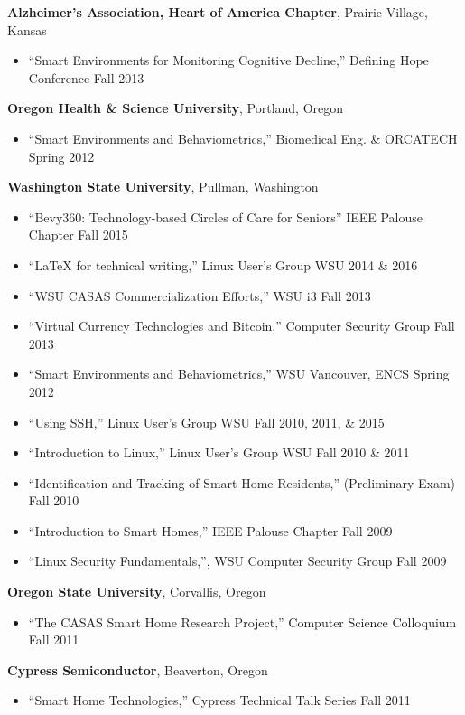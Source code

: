 {\bf Alzheimer's Association, Heart of America Chapter}, Prairie Village, Kansas
\begin{itemize}
  \item ``Smart Environments for Monitoring Cognitive Decline,'' Defining Hope Conference \hfill Fall 2013
\end{itemize}

{\bf Oregon Health \& Science University}, Portland, Oregon
\begin{itemize}
  \item ``Smart Environments and Behaviometrics,'' Biomedical Eng. \& ORCATECH \hfill Spring 2012
\end{itemize}

{\bf Washington State University}, Pullman, Washington
\begin{itemize}
  \item ``Bevy360: Technology-based Circles of Care for Seniors'' IEEE Palouse Chapter \hfill Fall 2015
  \item ``LaTeX for technical writing,'' Linux User's Group \@ WSU \hfill 2014 \& 2016
  \item ``WSU CASAS Commercialization Efforts,'' WSU i3 \hfill Fall 2013
  \item ``Virtual Currency Technologies and Bitcoin,'' Computer Security Group \hfill Fall 2013
  \item ``Smart Environments and Behaviometrics,'' WSU Vancouver, ENCS \hfill Spring 2012
	\item ``Using SSH,'' Linux User's Group \@ WSU \hfill Fall 2010, 2011, \& 2015
	\item ``Introduction to Linux,'' Linux User's Group \@ WSU \hfill Fall 2010 \& 2011
	\item ``Identification and Tracking of Smart Home Residents,'' (Preliminary Exam) \hfill Fall 2010
	\item ``Introduction to Smart Homes,'' IEEE Palouse Chapter \hfill Fall 2009
	\item ``Linux Security Fundamentals,'', WSU Computer Security Group \hfill Fall 2009
\end{itemize}

{\bf Oregon State University}, Corvallis, Oregon
\begin{itemize}
	\item ``The CASAS Smart Home Research Project,'' Computer Science Colloquium \hfill Fall 2011
\end{itemize}

{\bf Cypress Semiconductor}, Beaverton, Oregon
\begin{itemize}
	\item ``Smart Home Technologies,'' Cypress Technical Talk Series \hfill Fall 2011
\end{itemize}

